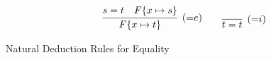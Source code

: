 \begin{table}[hbt]
	\begin{gather*}
	\infer[({=}e)]{F\{x\mapsto t\}}{s=t & F\{x\mapsto s\}}
	\qquad
	\infer[({=}i)]{t=t}{}
	\end{gather*}
	\caption{Natural Deduction Rules for Equality}\label{tab:natural:deduction:equality}
\end{table}
